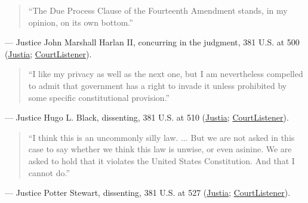 \documentclass[12pt]{article}
\begin{document}
\begin{quote}
``The Due Process Clause of the Fourteenth Amendment stands, in my opinion, on its own bottom.''
\end{quote}
\noindent --- Justice John Marshall Harlan II, concurring in the judgment, 381 U.S. at 500 (\href{https://supreme.justia.com/cases/federal/us/381/479/}{Justia}; \href{https://www.courtlistener.com/opinion/107082/griswold-v-connecticut/}{CourtListener}).

\begin{quote}
``I like my privacy as well as the next one, but I am nevertheless compelled to admit that government has a right to invade it unless prohibited by some specific constitutional provision.''
\end{quote}
\noindent --- Justice Hugo L. Black, dissenting, 381 U.S. at 510 (\href{https://supreme.justia.com/cases/federal/us/381/479/}{Justia}; \href{https://www.courtlistener.com/opinion/107082/griswold-v-connecticut/}{CourtListener}).

\begin{quote}
``I think this is an uncommonly silly law. ... But we are not asked in this case to say whether we think this law is unwise, or even asinine. We are asked to hold that it violates the United States Constitution. And that I cannot do.''
\end{quote}
\noindent --- Justice Potter Stewart, dissenting, 381 U.S. at 527 (\href{https://supreme.justia.com/cases/federal/us/381/479/}{Justia}; \href{https://www.courtlistener.com/opinion/107082/griswold-v-connecticut/}{CourtListener}).
\end{document}
